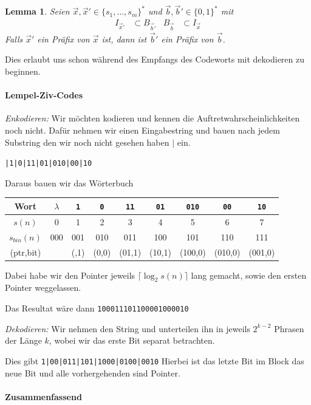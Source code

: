 \documentclass[25pt]{sciposter}
\newtheorem*{lem}{Lemma}
\begin{document}
\begin{multicols}{3}
\begin{lem}
	Seien $\vec{x}, \vec{x}' \in \{s_1,\ldots,s_m\}^*$ und $\vec{b}, \vec{b}' \in \{0,1\}^*$ mit
	\begin{align*}
		I_{\vec{x}'} &\subset B_{\vec{b}'} & B_{\vec{b}} &\subset I_{\vec{x}}
	\end{align*}
	Falls $\vec{x}'$ ein Präfix von $\vec{x}$ ist, dann ist $\vec{b}'$ ein Präfix von $\vec{b}$.
\end{lem}
Dies erlaubt uns schon während des Empfangs des Codeworts mit dekodieren zu beginnen.


\paragraph{Lempel-Ziv-Codes}
	\textit{Enkodieren:}	Wir möchten kodieren und kennen die Auftretwahrscheinlichkeiten noch nicht. Dafür nehmen wir einen Eingabestring und bauen nach jedem Substring den wir noch nicht gesehen haben $|$ ein.
	
	\texttt{|1|0|11|01|010|00|10}
	
	Daraus bauen wir das Wörterbuch
	
{
	\begin{tabular}{|c|c|c|c|c|c|c|c|c|}
	\hline
	Wort & $\lambda$ & \texttt{1} & \texttt{0}  & \texttt{11} & \texttt{01} & \texttt{010} & \texttt{00} & \texttt{10} \\
	\hline
	$s(n)$& 0 & 1 & 2 & 3 & 4 & 5 & 6 & 7 \\
	\hline
	 $s_{bin}(n)$ & 000 & 001 & 010 & 011 & 100 & 101 & 110 & 111 \\
	\hline
	(ptr,bit) & & (,1) & (0,0) & (01,1) & (10,1) & (100,0) & (010,0) & (001,0)\\ 
	\hline
\end{tabular}}
Dabei habe wir den Pointer jeweils $\lceil \log_2 s(n) \rceil$ lang gemacht, sowie den ersten Pointer weggelassen.

Das Resultat wäre dann \texttt{100011101100001000010}


\textit{Dekodieren:} Wir nehmen den String und unterteilen ihn in jeweils $2^{k-2}$ Phrasen der Länge $k$, wobei wir das erste Bit separat betrachten.

Dies gibt \texttt{1|00|011|101|1000|0100|0010}
Hierbei ist das letzte Bit im Block das neue Bit und alle vorhergehenden sind Pointer.


\paragraph{Zusammenfassend}


\end{multicols}
\end{document}

